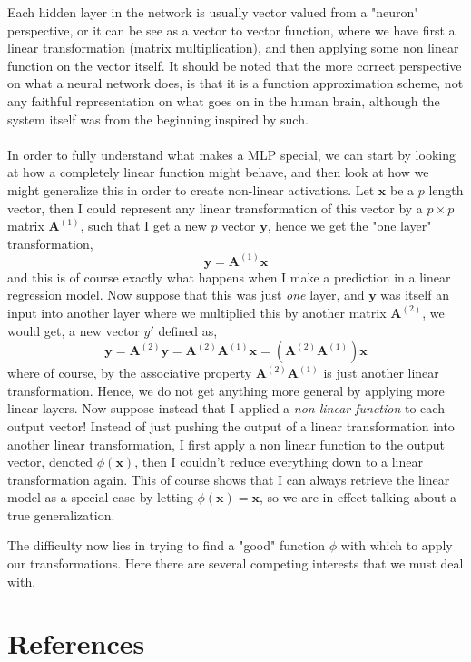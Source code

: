 \documentclass[10pt,a4paper]{article}
\begin{document}
Each hidden layer in the network is usually vector valued from a "neuron" perspective, or it can be see as a vector to vector function, where we have first a linear transformation (matrix multiplication), and then applying some non linear function on the vector itself. It should be noted that the more correct perspective on what a neural network does, is that it is a function approximation scheme, not any faithful representation on what goes on in the human brain, although the system itself was from the beginning inspired by such.\\\\
In order to fully understand what makes a MLP special, we can start by looking at how a completely linear function might behave, and then look at how we might generalize this in order to create non-linear activations. Let $\mathbf{x}$ be a $p$ length vector, then I could represent any linear transformation of this vector by a $p \times p$ matrix $\mathbf{A}^{(1)}$, such that I get a new $p$ vector $\mathbf{y}$, hence we get the "one layer" transformation,
$$
\mathbf{y} = \mathbf{A}^{(1)}\mathbf{x}
$$
and this is of course exactly what happens when I make a prediction in a linear regression model. Now suppose that this was just \textit{one} layer, and $\mathbf{y}$ was itself an input into another layer where we multiplied this by another matrix $\mathbf{A}^{(2)}$, we would get, a new vector $y'$ defined as,
$$
\mathbf{y} = \mathbf{A}^{(2)}\mathbf{y} = \mathbf{A}^{(2)} \mathbf{A}^{(1)}\mathbf{x} = (\mathbf{A}^{(2)} \mathbf{A}^{(1)})\mathbf{x}
$$
where of course, by the associative property $\mathbf{A}^{(2)} \mathbf{A}^{(1)}$ is just another linear transformation. Hence, we do not get anything more general by applying more linear layers. Now suppose instead that I applied a \textit{non linear function} to each output vector! Instead of just pushing the output of a linear transformation into another linear transformation, I first apply a non linear function to the output vector, denoted $\phi(\mathbf{x})$, then I couldn't reduce everything down to a linear transformation again. This of course shows that I can always retrieve the linear model as a special case by letting $\phi(\mathbf{x}) = \mathbf{x}$, so we are in effect talking about a true generalization. 

The difficulty now lies in trying to find a "good" function $\phi$ with which to apply our transformations. Here there are several competing interests that we must deal with.

 

\section{References}
\end{document}
